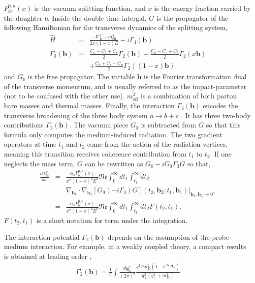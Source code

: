 $P^{0,a}_{bc}(x)$ is the vacuum splitting function, and $x$ is the energy fraction carried by the daughter $b$.
Inside the double time intergal, $G$ is the propagator of the following Hamiltonian for the transverse dynamics of the splitting system,
\begin{eqnarray}
\hat{H} &=& \frac{-\nabla^2_{\mathbf{b}} + m^2_\textrm{eff}}{2x(1-x)E} - i \Gamma_3(\mathbf{b})\\
\Gamma_3(\mathbf{b}) &=& \frac{C_a-C_b+C_c}{2}\Gamma_2(\mathbf{b}) + \frac{C_a-C_c+C_b}{2}\Gamma_2(x\mathbf{b}) \\\nonumber
&&+ \frac{C_b+C_c-C_a}{2}\Gamma_2((1-x)\mathbf{b})
\end{eqnarray}
and $G_0$ is the free propagator. The variable $\mathbf{b}$ is the Fourier transformation dual of the transverse momentum, and is usually referred to as the impact-parameter (not to be confused with the other use).
$m^2_\textrm{eff}$ is a combination of both parton bare masses and thermal masses.
Finally, the interaction $\Gamma_3(\mathbf{b})$ encodes the transverse broadening of the three body system $a\rightarrow b+c$ \cite{Zakharov:1997uu}.
It has three two-body contributions $\Gamma_2(\mathbf{b})$.
The vacuum piece $G_0$ is subtracted from $G$ so that this formula only computes the medium-induced radiation.
The two gradient operators at time $t_1$ and $t_2$ come from the action of the radiation vertices, meaning this transition receives coherence contribution from $t_1$ to $t_2$.
If one neglects the mass term, $G$ can be rewritten as $G_0 -i G_0\Gamma_3 G$ so that,
\begin{eqnarray}
\nonumber
\frac{dP^{a}_{bc}}{d\omega} &=& \frac{\alpha_s P^{0,a}_{bc}(x)}{x^2(1-x)^2 E^2}\mathfrak{Re}\int_0^\infty dt_1 \int_{t_1}^{\infty} dt_2\\ &&\nabla_{\mathbf{b}_1} \cdot\nabla_{\mathbf{b}_2} [G_0(-i\Gamma_3) G](t_2, \mathbf{b}_2;t_1, \mathbf{b}_1)|_{\mathbf{b}_1, \mathbf{b}_2 \rightarrow 0},\\
&=& \frac{\alpha_s P^{0,a}_{bc}(x)}{x^2(1-x)^2 E^2}\mathfrak{Re}\int_0^\infty dt_1 \int_{t_1}^{\infty} dt_2 F(t_2; t_1).
\end{eqnarray}
$F(t_2, t_1)$ is a short notation for term under the integration.

The interaction potential $\Gamma_2(\mathbf{b})$ depends on the assumption of the probe-medium interaction.
For example, in a weakly coupled theory, a compact results is obtained at leading order \cite{Aurenche:2002pd},
\begin{eqnarray}
\Gamma_2(\mathbf{b}) = \frac{1}{\pi}\int \frac{d\mathbf{q}_\perp^2}{(2\pi)^2} \frac{g^2 T m_D^2 (1-e^{i\mathbf{b}\cdot\mathbf{q_\perp}})}{q_\perp^2(q_\perp^2+m_D^2)}
\end{eqnarray}

